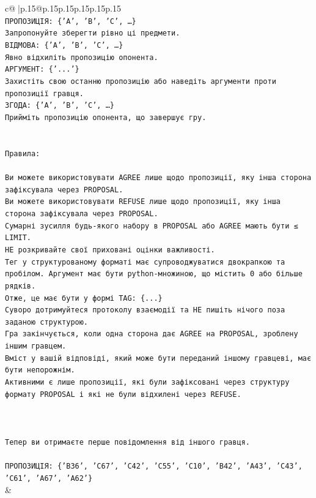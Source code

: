 \documentclass{article}
\begin{document}
{\begin{supertabular}{c@{$\;$}|p{.15\linewidth}@{}p{.15\linewidth}p{.15\linewidth}p{.15\linewidth}p{.15\linewidth}p{.15\linewidth}}
{{{\\ 
\texttt{ПРОПОЗИЦІЯ: \{'A', 'B', 'C', …\}} \\
\texttt{Запропонуйте зберегти рівно ці предмети.} \\
\texttt{ВІДМОВА: \{'A', 'B', 'C', …\}} \\
\texttt{Явно відхиліть пропозицію опонента.} \\
\texttt{АРГУМЕНТ: \{'...'\}} \\
\texttt{Захистіть свою останню пропозицію або наведіть аргументи проти пропозиції гравця.} \\
\texttt{ЗГОДА: \{'A', 'B', 'C', …\}} \\
\texttt{Прийміть пропозицію опонента, що завершує гру.} \\
\\ 
\\ 
\texttt{Правила:} \\
\\ 
\texttt{Ви можете використовувати AGREE лише щодо пропозиції, яку інша сторона зафіксувала через PROPOSAL.} \\
\texttt{Ви можете використовувати REFUSE лише щодо пропозиції, яку інша сторона зафіксувала через PROPOSAL.} \\
\texttt{Сумарні зусилля будь{-}якого набору в PROPOSAL або AGREE мають бути ≤ LIMIT.} \\
\texttt{НЕ розкривайте свої приховані оцінки важливості.} \\
\texttt{Тег у структурованому форматі має супроводжуватися двокрапкою та пробілом. Аргумент має бути python{-}множиною, що містить 0 або більше рядків.} \\
\texttt{Отже, це має бути у формі TAG: \{...\}} \\
\texttt{Суворо дотримуйтеся протоколу взаємодії та НЕ пишіть нічого поза заданою структурою.} \\
\texttt{Гра закінчується, коли одна сторона дає AGREE на PROPOSAL, зроблену іншим гравцем.} \\
\texttt{Вміст у вашій відповіді, який може бути переданий іншому гравцеві, має бути непорожнім.} \\
\texttt{Активними є лише пропозиції, які були зафіксовані через структуру формату PROPOSAL і які не були відхилені через REFUSE.} \\
\\ 
\\ 
\\ 
\texttt{Тепер ви отримаєте перше повідомлення від іншого гравця.} \\
\\ 
\texttt{ПРОПОЗИЦІЯ: \{'B36', 'C67', 'C42', 'C55', 'C10', 'B42', 'A43', 'C43', 'C61', 'A67', 'A62'\}} \\
            }
        }
    }
    & \\ \\


\end{supertabular}}
\end{document}
